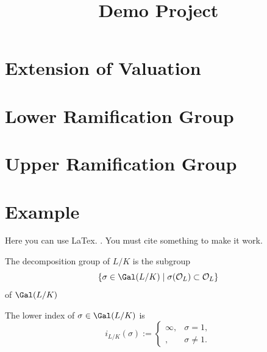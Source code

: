 
\title{Demo Project}




\maketitle


\tableofcontents

\section{Extension of Valuation}


\section{Lower Ramification Group}


\section{Upper Ramification Group}


\section{Example}
Here you can use LaTex. \cite{marcus}. You must cite something to make it work.




\begin{definition}
    \label{decompositionGroup}
    \leanok
    The decomposition group of $L/K$ is the subgroup \[\{\sigma\in\Gal(L/K)\mid \sigma(\mathcal{O}_L) \subset \mathcal{O}_L\}\] of $\Gal(L/K)$ 
\end{definition}

\begin{definition}
    \label{lowerIndex}
    \leanok
    The lower index of $\sigma\in\Gal(L/K)$ is \[i_{L/K}(\sigma) := \begin{cases}
        \infty, &\sigma = 1,\\
        , &\sigma\ne 1.
    \end{cases}\]
\end{definition}

